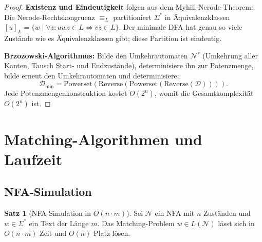 ﻿\documentclass[a4paper,12pt]{article}
\theoremstyle{definition}
\newtheorem{satz}{Satz}
\begin{document}
\begin{proof}
	\textbf{Existenz und Eindeutigkeit} folgen aus dem Myhill-Nerode-Theorem:
	Die Nerode-Rechtskongruenz $\equiv_L$ partitioniert $\Sigma^*$ in
	Äquivalenzklassen $[u]_L = \{w \mid \forall z: uwz \in L \Leftrightarrow vz \in L\}$.
	Der minimale DFA hat genau so viele Zustände wie es Äquivalenzklassen gibt;
	diese Partition ist eindeutig.

	\textbf{Brzozowski-Algorithmus:} Bilde den Umkehrautomaten $\mathcal{N}^r$
	(Umkehrung aller Kanten, Tausch Start- und Endzustände), determinisiere ihn
	zur Potenzmenge, bilde erneut den Umkehrautomaten und determinisiere:
	\[
		\mathcal{D}_{\min} = \mathrm{Powerset}\!\left(\mathrm{Reverse}\!\left(
		\mathrm{Powerset}(\mathrm{Reverse}(\mathcal{D}))\right)\right).
	\]
	Jede Potenzmengenkonstruktion kostet $O(2^n)$, womit die Gesamtkomplexität
	$O(2^n)$ ist. \qedhere
\end{proof}

\section{Matching-Algorithmen und Laufzeit}

\subsection{NFA-Simulation}

\begin{satz}[NFA-Simulation in $O(n \cdot m)$]
	\label{satz:nfa-sim}
	Sei $\mathcal{N}$ ein NFA mit $n$ Zuständen und $w \in \Sigma^*$ ein Text der
	Länge $m$. Das Matching-Problem $w \in L(\mathcal{N})$ lässt sich in
	$O(n \cdot m)$ Zeit und $O(n)$ Platz lösen.
\end{satz}
\end{document}
